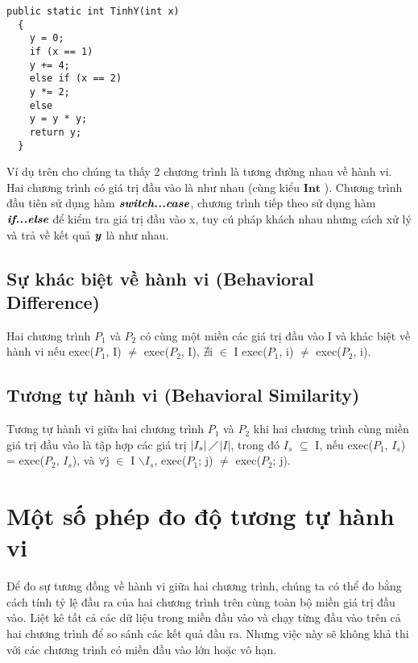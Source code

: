\begin{lstlisting}[language={[Sharp]C}, caption={Tính y, sử dụng hàm If...else}, label={Script}]
  public static int TinhY(int x)
  {
    y = 0;
    if (x == 1)
    y += 4;
    else if (x == 2)
    y *= 2;
    else
    y = y * y;
    return y;
  }
\end{lstlisting}

Ví dụ trên cho chúng ta thấy 2 chương trình là tương đường nhau về
hành vi. Hai chương trình có giá trị đầu vào là như nhau (cùng kiểu
$\textbf{Int}$ ). Chương trình đầu tiên sử dụng hàm
$\textit{\textbf{switch...case}}$, chương trình tiếp theo sử dụng hàm
$\textit{\textbf{if...else}}$ để kiểm tra giá trị đầu vào x, tuy cú pháp
khách nhau nhưng cách xử lý và trả về kết quả $\textbf{\textit{y}}$ là
như nhau.
	
\subsection{Sự khác biệt về hành vi (Behavioral Difference)}
\begin{definition}
  Hai chương trình $P_{1}$ và $P_{2}$ có cùng một miền các giá trị đầu
  vào I và khác biệt về hành vi nếu exec($P_{1}$, I) $\neq$
  exec($P_{2}$, I), $\nexists$i $\in$ I exec($P_{1}$, i) $\neq$
  exec($P_{2}$, i).
\end{definition}

\subsection{Tương tự hành vi (Behavioral Similarity)}
\begin{definition}
  Tương tự hành vi giữa hai chương trình $P_{1}$ và $P_{2}$ khi hai
  chương trình cùng miền giá trị đầu vào là tập hợp các giá trị
  $\left|I_{s}\right|\diagup$$\left|I\right|$, trong đó
  $I_{s}$ $\subseteq $ I, nếu exec($P_{1}$, $I_{s}$) =
  exec($P_{2}$, $I_{s}$), và $\forall$j $\in$ I
  $\backslash$$I_{s}$, exec($P_{1}$; j) $\neq$ exec($P_{2}$; j).
\end{definition}

\section{Một số phép đo độ tương tự hành vi}
Để đo sự tương đồng về hành vi giữa hai chương trình, chúng ta có thể đo bằng cách tính tỷ lệ đầu ra của hai chương trình trên cùng toàn bộ miền giá trị đầu vào. Liệt kê tất cả các dữ liệu trong miền đầu vào và chạy từng đầu vào trên cả hai chương trình để so sánh các kết quả đầu ra. Nhưng việc này sẽ không khả thi với các chương trình có miền đầu vào lớn hoặc vô hạn.
	

